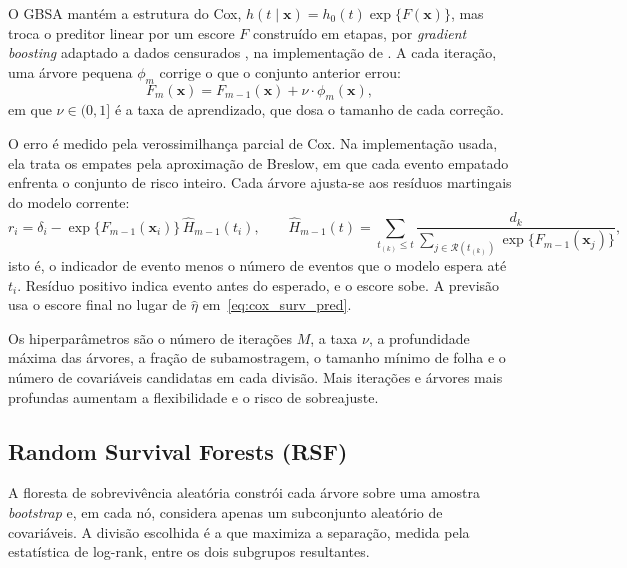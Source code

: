 O GBSA mantém a estrutura do Cox, $h(t \mid \mathbf{x}) = h_0(t)\exp\{F(\mathbf{x})\}$, mas troca o preditor linear por um escore $F$ construído em etapas, por \textit{gradient boosting} \citep{friedman2001} adaptado a dados censurados \citep{hothorn2006}, na implementação de \citet{polsterl2020}. A cada iteração, uma árvore pequena $\phi_m$ corrige o que o conjunto anterior errou:
\begin{equation}
  F_m(\mathbf{x}) = F_{m-1}(\mathbf{x}) + \nu \cdot \phi_m(\mathbf{x}),
  \label{eq:gbsa}
\end{equation}
em que $\nu \in (0,1]$ é a taxa de aprendizado, que dosa o tamanho de cada correção.

O erro é medido pela verossimilhança parcial de Cox. Na implementação usada, ela trata os empates pela aproximação de Breslow, em que cada evento empatado enfrenta o conjunto de risco inteiro. Cada árvore ajusta-se aos resíduos martingais do modelo corrente:
\begin{equation}
  r_{i} = \delta_i - \exp\{F_{m-1}(\mathbf{x}_i)\}\,\hat{H}_{m-1}(t_i),
  \qquad
  \hat{H}_{m-1}(t) = \sum_{t_{(k)} \leq t} \frac{d_k}{\sum_{j \in \mathcal{R}(t_{(k)})} \exp\{F_{m-1}(\mathbf{x}_j)\}},
  \label{eq:gbsa_residuo}
\end{equation}
isto é, o indicador de evento menos o número de eventos que o modelo espera até $t_i$. Resíduo positivo indica evento antes do esperado, e o escore sobe. A previsão usa o escore final no lugar de $\hat{\eta}$ em~\eqref{eq:cox_surv_pred}.

Os hiperparâmetros são o número de iterações $M$, a taxa $\nu$, a profundidade máxima das árvores, a fração de subamostragem, o tamanho mínimo de folha e o número de covariáveis candidatas em cada divisão. Mais iterações e árvores mais profundas aumentam a flexibilidade e o risco de sobreajuste.

    \subsection{Random Survival Forests (RSF)}
    \label{subsec:rsf}

A floresta de sobrevivência aleatória \citep{ishwaran2008} constrói cada árvore sobre uma amostra \textit{bootstrap} e, em cada nó, considera apenas um subconjunto aleatório de covariáveis. A divisão escolhida é a que maximiza a separação, medida pela estatística de log-rank, entre os dois subgrupos resultantes.

